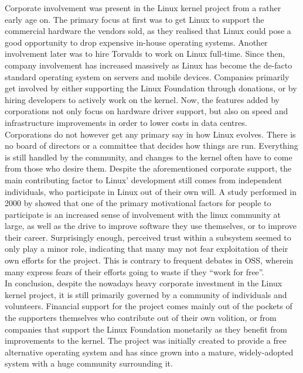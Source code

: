Corporate involvement was present in the Linux kernel project from a rather early age on\cite{linus-biography}. The primary focus at first was to get Linux to support the commercial hardware the vendors sold, as they realised that Linux could pose a good opportunity to drop expensive in-house operating systems. Another involvement later was to hire Torvalds to work on Linux full-time. Since then, company involvement has increased massively as Linux has become the de-facto standard operating system on servers\cite{linux-server} and mobile devices\cite{linux-usage}. Companies primarily get involved by either supporting the Linux Foundation through donations\cite{linux-foundation}, or by hiring developers to actively work on the kernel\cite{linux-whowrites}. Now, the features added by corporations not only focus on hardware driver support, but also on speed and infrastructure improvements in order to lower costs in data centres\cite{linux-bbr}. \\

Corporations do not however get any primary say in how Linux evolves. There is no board of directors or a committee that decides how things are run. Everything is still handled by the community, and changes to the kernel often have to come from those who desire them. Despite the aforementioned corporate support, the main contributing factor to Linux' development still comes from independent individuals, who participate in Linux out of their own will. A study performed in 2000 by \citet{linux-motivation} showed that one of the primary motivational factors for people to participate is an increased sense of involvement with the linux community at large, as well as the drive to improve software they use themselves, or to improve their career. Surprisingly enough, perceived trust within a subsystem seemed to only play a minor role, indicating that many may not fear exploitation of their own efforts for the project. This is contrary to frequent debates in OSS, wherein many express fears of their efforts going to waste if they ``work for free''. \\

In conclusion, despite the nowadays heavy corporate investment in the Linux kernel project, it is still primarily governed by a community of individuals and volunteers. Financial support for the project comes mainly out of the pockets of the supporters themselves who contribute out of their own volition, or from companies that support the Linux Foundation monetarily as they benefit from improvements to the kernel. The project was initially created to provide a free alternative operating system and has since grown into a mature, widely-adopted system with a huge community surrounding it.

